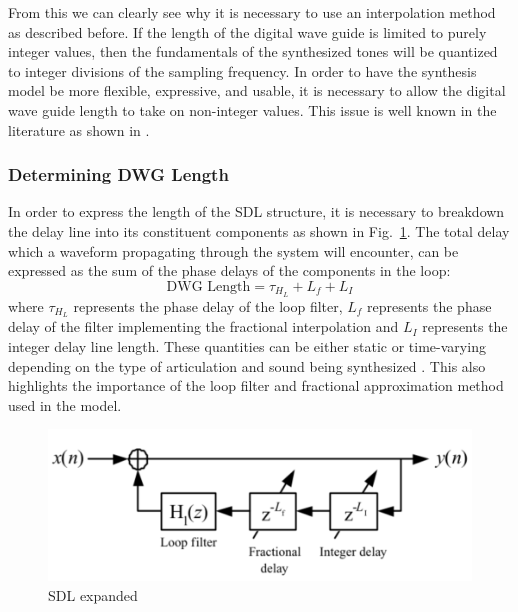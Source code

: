\documentclass[main.tex]{subfiles}
\begin{document}
From this we can clearly see why it is necessary to use an interpolation method as described before. If the length of the digital wave guide is limited to purely integer values, then the fundamentals of the synthesized tones will be quantized to integer divisions of the sampling frequency. In order to have the synthesis model be more flexible, expressive, and usable, it is necessary to allow the digital wave guide length to take on non-integer values. This issue is well known in the literature as shown in .

\subsubsection{Determining DWG Length}
In order to express the length of the SDL structure, it is necessary to breakdown the delay line into its constituent components as shown in Fig.~\ref{fig:SDLBreakdown}. The total delay which a waveform propagating through the system will encounter, can be expressed as the sum of the phase delays of the components in the loop: 
\begin{equation}
    \text{DWG Length} = \tau_{H_L} + L_f + L_I
\end{equation}
where $\tau_{H_L}$ represents the phase delay of the loop filter, $L_f$ represents the phase delay of the filter implementing the fractional interpolation and $L_I$ represents the integer delay line length. These quantities can be either static or time-varying depending on the type of articulation and sound being synthesized . This also highlights the importance of the loop filter and fractional approximation method used in the model.

\begin{figure}[h]
    \centering
    \includegraphics[scale=1]{./images/diagrams/SDLModelExpanded.png}
    \caption{SDL expanded }
    \label{fig:SDLBreakdown}
\end{figure}
\end{document}
